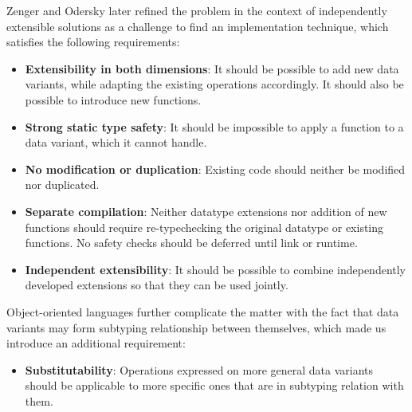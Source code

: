 \documentclass[preprint]{sigplanconf}
\begin{document}
Zenger and Odersky later refined the problem in the context of independently 
extensible solutions\cite{fool12} as a challenge to find an implementation 
technique, which satisfies the following requirements:

\begin{itemize}
\setlength{\itemsep}{0pt}
\setlength{\parskip}{0pt}
\item {\bf Extensibility in both dimensions}: It should be possible to add new 
      data variants, while adapting the existing operations accordingly. It 
      should also be possible to introduce new functions. 
\item {\bf Strong static type safety}: It should be impossible to apply a 
      function to a data variant, which it cannot handle. 
\item {\bf No modification or duplication}: Existing code should neither be 
      modified nor duplicated.
\item {\bf Separate compilation}: Neither datatype extensions nor addition of 
      new functions should require re-typechecking the original datatype or 
      existing functions. No safety checks should be deferred until link or 
      runtime.
\item {\bf Independent extensibility}: It should be possible to combine 
      independently developed extensions so that they can be used jointly.
\end{itemize}


\noindent
Object-oriented languages further complicate the matter with the fact that 
data variants may form subtyping relationship between themselves, which made us 
introduce an additional requirement:

\begin{itemize}
\setlength{\itemsep}{0pt}
\setlength{\parskip}{0pt}
\item {\bf Substitutability}: Operations expressed on more general data variants
      should be applicable to more specific ones that are in subtyping relation 
      with them.
\end{itemize}

\end{document}

